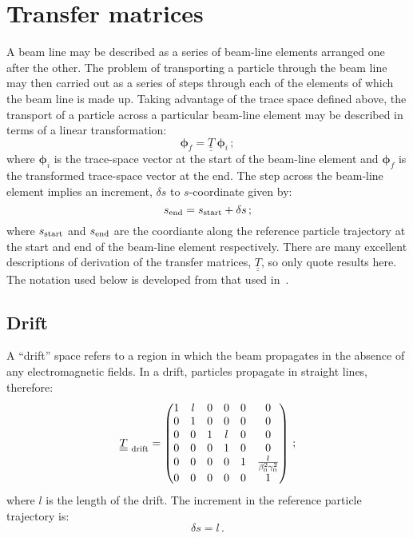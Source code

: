 \graphicspath{ {04-TransferMatrices/Figures/} }

\section{Transfer matrices}

A beam line may be described as a series of beam-line elements
arranged one after the other.
The problem of transporting a particle through the beam line may then
carried out as a series of steps through each of the elements of which
the beam line is made up.
Taking advantage of the trace space defined above, the transport of
a particle across a particular beam-line element may be described in
terms of a linear transformation:
\begin{equation}
  \bm{\phi}_f = \underline{\underline{T}} ~ \bm{\phi}_i \, ;
\end{equation}
where $\bm{\phi}_i$ is the trace-space vector at the start of the
beam-line element and $\bm{\phi}_f$ is the transformed trace-space
vector at the end.
The step across the beam-line element implies an increment, $\delta s$
to $s$-coordinate given by:
\begin{equation}
  s_{\rm end} = s_{\rm start} + \delta s \, ;
\end{equation}
where $s_{\rm start}$ and $s_{\rm end}$ are the coordiante along the
reference particle trajectory at the start and end of the beam-line
element respectively.
There are many excellent descriptions of derivation of the transfer
matrices, $\underline{\underline{T}}$, so only quote results here.
The notation used below is developed from that used
in~\cite{Wolslki}.

\subsection{Drift}

A ``drift'' space refers to a region in which the beam propagates in
the absence of any electromagnetic fields.
In a drift, particles propagate in straight lines, therefore:
\begin{equation}
  \underline{\underline{T}}_{\rm~drift} =
        \begin{pmatrix}
          1 & l & 0 & 0 & 0 &                             0 \\
          0 & 1 & 0 & 0 & 0 &                             0 \\
          0 & 0 & 1 & l & 0 &                             0 \\
          0 & 0 & 0 & 1 & 0 &                             0 \\
          0 & 0 & 0 & 0 & 1 & \frac{l}{\beta_0^2 \gamma_0^2} \\
          0 & 0 & 0 & 0 & 0 &                             1
        \end{pmatrix} \, ; 
\end{equation}
where $l$ is the length of the drift.
The increment in the reference particle trajectory is:
\begin{equation}
  \delta s = l \, .
\end{equation}

